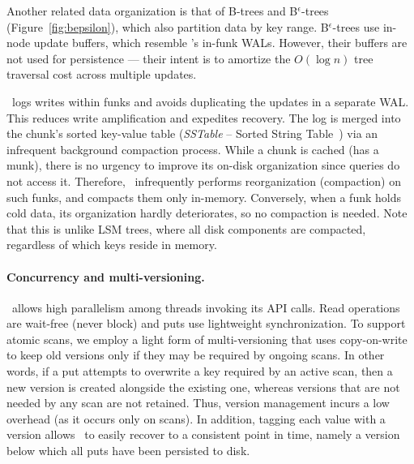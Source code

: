 Another related data organization is that of  B-trees and B$^\epsilon$-trees (Figure~\ref{fig:bepsilon}), which also partition data by key range. 
B$^\epsilon$-trees use in-node update buffers, which resemble \sys's in-funk WALs.
However, their buffers are not used for persistence --- their intent is to amortize the $O(\log n)$ tree traversal cost across multiple updates. 

\sys\ logs writes within funks and avoids duplicating the updates  in a separate WAL. This reduces write amplification and expedites recovery. 
The  log is merged into the chunk's sorted key-value table (\emph{SSTable} -- Sorted String Table~\cite{Bigtable2008}) 
via an infrequent background compaction process. 
While a chunk is cached (has a munk), there is no urgency to improve its on-disk organization since 
queries do not access it. Therefore, \sys\ infrequently performs reorganization (compaction) on such funks,
and compacts them only in-memory.
Conversely, when a funk holds cold data, its organization hardly deteriorates, so no compaction is needed.
Note that this is unlike LSM trees, where all disk components are compacted, regardless of which keys reside in memory.


 \paragraph{Concurrency and multi-versioning.}
 \sys\ allows high parallelism among threads invoking its API calls. 
 Read operations are wait-free (never block) and puts use lightweight synchronization. 
 To support atomic scans, we  employ a light form of multi-versioning that uses 
copy-on-write to keep old versions only if they may be required by ongoing scans. 
In other words, if a put attempts to overwrite a key required by an active scan, then a new version is created alongside the 
existing one, whereas versions that are not needed by any scan are not retained. 
Thus, version management incurs a low overhead (as it occurs only on scans). 
In addition, tagging each value with a version allows \sys\ to easily recover to a consistent point in time, namely a version below which all puts have been persisted to disk.

